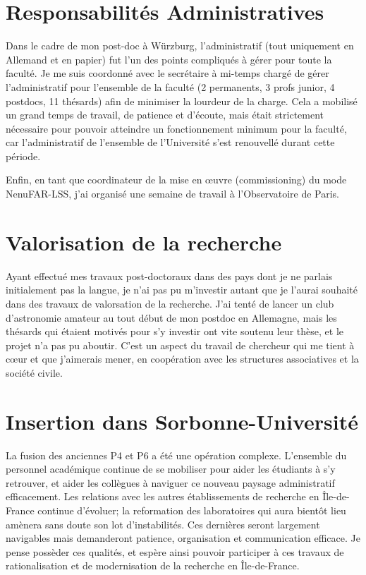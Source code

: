 \section{Responsabilit\'es Administratives}

\pg
Dans le cadre de mon post-doc \`a W\"urzburg, l'administratif (tout uniquement en Allemand et en papier) fut l'un des points compliqu\'es \`a g\'erer pour toute la facult\'e. Je me suis coordonn\'e avec le secr\'etaire \`a mi-temps charg\'e de g\'erer l'administratif pour l'ensemble de la facult\'e (2 permanents, 3 profs junior, 4 postdocs, 11 th\'esards) afin de minimiser la lourdeur de la charge. Cela a mobilis\'e un grand temps de travail, de patience et d'\'ecoute, mais \'etait strictement n\'ecessaire pour pouvoir atteindre un fonctionnement minimum pour la facult\'e, car l'administratif de l'ensemble de l'Universit\'e s'est renouvell\'e durant cette p\'eriode. 

\pg
Enfin, en tant que coordinateur de la mise en {\oe}uvre (commissioning) du mode NenuFAR-LSS, j'ai organis\'e une semaine de travail \`a l'Observatoire de Paris. 



\section{Valorisation de la recherche}

\pg
Ayant effectu\'e mes travaux post-doctoraux dans des pays dont je ne parlais initialement pas la langue, je n'ai pas pu m'investir autant que je l'aurai souhait\'e dans des travaux de valorsation de la recherche. J'ai tent\'e de lancer un club d'astronomie amateur au tout d\'ebut de mon postdoc en Allemagne, mais les th\'esards qui \'etaient motiv\'es pour s'y investir ont vite soutenu leur th\`ese, et le projet n'a pas pu aboutir. C'est un aspect du travail de chercheur qui me tient \`a c{\oe}ur et que j'aimerais mener, en coop\'eration avec les structures associatives et la soci\'et\'e civile.


\section{Insertion dans Sorbonne-Universit\'e}


\pg
La fusion des anciennes P4 et P6 a \'et\'e une op\'eration complexe. L'ensemble du personnel acad\'emique continue de se mobiliser pour aider les \'etudiants \`a s'y retrouver, et aider les coll\`egues \`a naviguer ce nouveau paysage administratif efficacement. Les relations avec les autres \'etablissements de recherche en \^Ile-de-France continue d'\'evoluer; la reformation des laboratoires qui aura bient\^ot lieu am\`enera sans doute son lot d'instabilit\'es. Ces derni\`eres seront largement navigables mais demanderont patience, organisation et communication efficace. Je pense poss\`eder ces qualit\'es, et esp\`ere ainsi pouvoir participer \`a ces travaux de rationalisation et de modernisation de la recherche en \^Ile-de-France.













